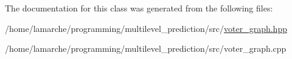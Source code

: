 The documentation for this class was generated from the following files\-:\begin{DoxyCompactItemize}
\item 
/home/lamarche/programming/multilevel\-\_\-prediction/src/\hyperlink{voter__graph_8hpp}{voter\-\_\-graph.\-hpp}\item 
/home/lamarche/programming/multilevel\-\_\-prediction/src/voter\-\_\-graph.\-cpp\end{DoxyCompactItemize}
